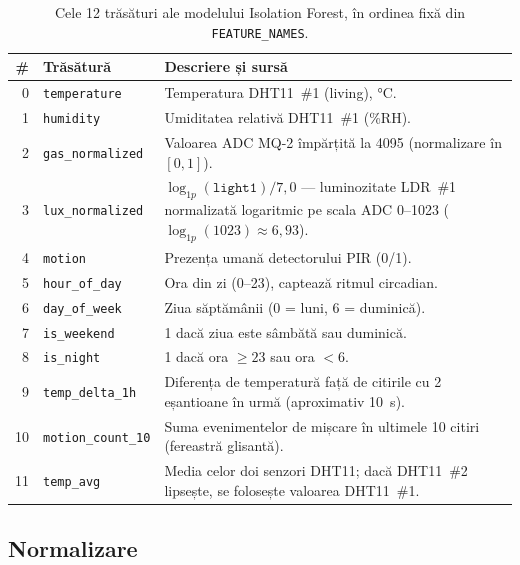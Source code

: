 \begin{table}[H]
  \centering
  \caption{Cele 12 trăsături ale modelului Isolation Forest, în ordinea fixă din \texttt{FEATURE\_NAMES}.}
  \label{tab:features}
  \begin{tabular}{@{}r l p{7.5cm}@{}}
    \toprule
    \textbf{\#} & \textbf{Trăsătură} & \textbf{Descriere și sursă} \\
    \midrule
    0  & \texttt{temperature}      & Temperatura DHT11~\#1 (living), °C. \\
    1  & \texttt{humidity}         & Umiditatea relativă DHT11~\#1 (\%RH). \\
    2  & \texttt{gas\_normalized}  & Valoarea ADC MQ-2 împărțită la 4095
                                     (normalizare în $[0,1]$). \\
    3  & \texttt{lux\_normalized}  & $\log_{1p}(\texttt{light1}) / 7{,}0$ —
                                     luminozitate LDR~\#1 normalizată logaritmic
                                     pe scala ADC 0–1023
                                     ($\log_{1p}(1023) \approx 6{,}93$). \\
    4  & \texttt{motion}           & Prezența umană detectorului PIR (0/1). \\
    5  & \texttt{hour\_of\_day}    & Ora din zi (0–23), captează ritmul circadian. \\
    6  & \texttt{day\_of\_week}    & Ziua săptămânii (0 = luni, 6 = duminică). \\
    7  & \texttt{is\_weekend}      & 1 dacă ziua este sâmbătă sau duminică. \\
    8  & \texttt{is\_night}        & 1 dacă ora $\geq 23$ sau ora $< 6$. \\
    9  & \texttt{temp\_delta\_1h}  & Diferența de temperatură față de citirile
                                     cu 2 eșantioane în urmă (aproximativ 10~s). \\
    10 & \texttt{motion\_count\_10}& Suma evenimentelor de mișcare în ultimele
                                     10 citiri (fereastră glisantă). \\
    11 & \texttt{temp\_avg}        & Media celor doi senzori DHT11; dacă DHT11~\#2
                                     lipsește, se folosește valoarea DHT11~\#1. \\
    \bottomrule
  \end{tabular}
\end{table}

\subsection{Normalizare}

